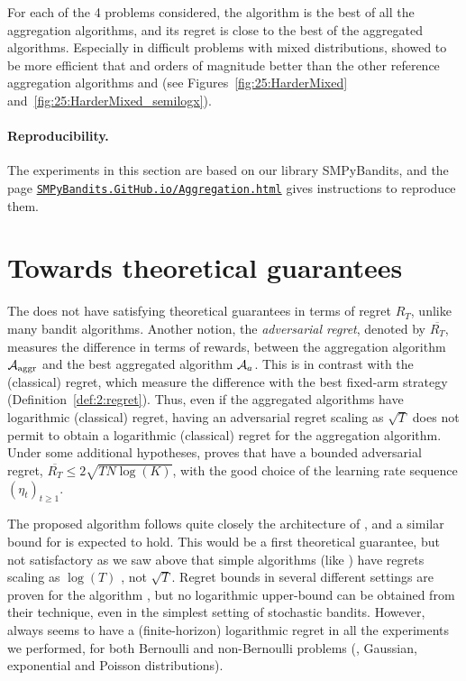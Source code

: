 For each of the 4 problems considered, the \Aggr{} algorithm  is the best of all the aggregation algorithms,
and its regret is close to the best of the aggregated algorithms.
Especially in difficult problems with mixed distributions, \Aggr{} showed to be more efficient that \ExpQ{} and orders of magnitude better than the other reference aggregation algorithms \LearnExp{} and \CORRAL{} (see Figures~\ref{fig:25:HarderMixed} and~\ref{fig:25:HarderMixed_semilogx}).


\paragraph{Reproducibility.}
%
The experiments in this section are based on our library SMPyBandits,
and the page \href{https://SMPyBandits.GitHub.io/Aggregation.html}{\texttt{SMPyBandits.GitHub.io/Aggregation.html}} gives instructions to reproduce them.


\section{Towards theoretical guarantees}\label{sec:25:theory}

The \Aggr{} does not have satisfying theoretical guarantees in terms of regret $R_T$, unlike many bandit algorithms.
%
Another notion, the \emph{adversarial regret}, denoted by $\overline{R_T}$,
measures the difference in terms of rewards,
between the aggregation algorithm $\mathcal{A}_{\mathrm{aggr}}$ and the best aggregated algorithm $\mathcal{A}_a$. This is in contrast with the (classical) regret, which measure the difference with the best fixed-arm strategy (Definition~\ref{def:2:regret}).
Thus, even if the aggregated algorithms have logarithmic (classical) regret, having an adversarial regret scaling as $\sqrt{T}$ does not permit to obtain a logarithmic (classical) regret for the aggregation algorithm.
%
%
Under some additional hypotheses,
\cite[Theorem 4.2]{Bubeck12} proves that
\ExpQ{} have a bounded adversarial regret, %
$\overline{R_T} \leq 2 \sqrt{T N \log(K)}$,
with the good choice of the learning rate sequence $(\eta_t)_{t \geq 1}$.

The proposed algorithm follows quite closely the architecture of \ExpQ,
and a similar bound for \Aggr{} is expected to hold.
%
This would be a first theoretical guarantee, but not satisfactory as we saw above that simple algorithms (like \UCB) have regrets scaling as $\log(T)$ \cite{Auer02,Bubeck12}, not $\sqrt{T}$.
%
Regret bounds in several different settings are proven for the \CORRAL{} algorithm \cite{Agarwal16}, but no logarithmic upper-bound can be obtained from their technique, even in the simplest setting of stochastic bandits.
%
However, \Aggr{} always seems to have a (finite-horizon) logarithmic regret in all the experiments we performed,
for both Bernoulli and non-Bernoulli problems (\eg, Gaussian, exponential and Poisson distributions).


